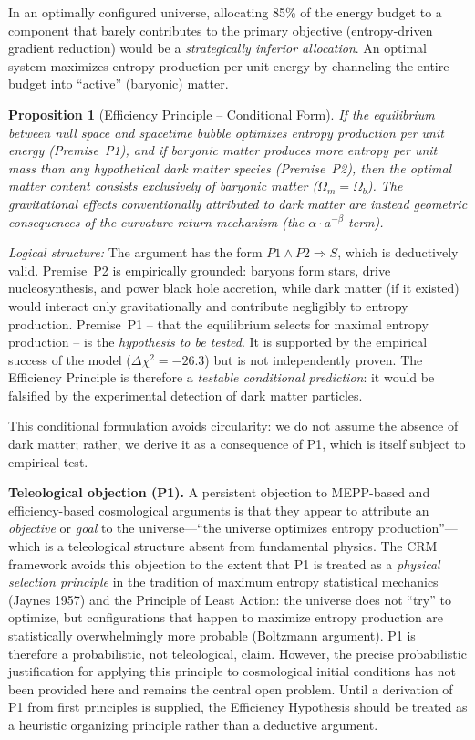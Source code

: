 \documentclass[aps,prd,twocolumn,superscriptaddress,nofootinbib,floatfix]{revtex4-2}
\newtheorem{proposition}{Proposition}
\begin{document}
In an optimally configured universe, allocating 85\% of the energy budget to a component that barely contributes to the primary objective (entropy-driven gradient reduction) would be a \textit{strategically inferior allocation}. An optimal system maximizes entropy production per unit energy by channeling the entire budget into ``active'' (baryonic) matter.

\begin{proposition}[Efficiency Principle -- Conditional Form]
\textit{If} the equilibrium between null space and spacetime bubble optimizes entropy production per unit energy (Premise~P1), and \textit{if} baryonic matter produces more entropy per unit mass than any hypothetical dark matter species (Premise~P2), \textit{then} the optimal matter content consists exclusively of baryonic matter ($\Omega_m = \Omega_b$). The gravitational effects conventionally attributed to dark matter are instead geometric consequences of the curvature return mechanism (the $\alpha \cdot a^{-\beta}$ term).
\end{proposition}

\textit{Logical structure:} The argument has the form $P1 \wedge P2 \Rightarrow S$, which is deductively valid. Premise~P2 is empirically grounded: baryons form stars, drive nucleosynthesis, and power black hole accretion, while dark matter (if it existed) would interact only gravitationally and contribute negligibly to entropy production. Premise~P1 -- that the equilibrium selects for maximal entropy production -- is the \textit{hypothesis to be tested}. It is supported by the empirical success of the model ($\Delta\chi^2 = -26.3$) but is not independently proven. The Efficiency Principle is therefore a \textit{testable conditional prediction}: it would be falsified by the experimental detection of dark matter particles.

This conditional formulation avoids circularity: we do not assume the absence of dark matter; rather, we derive it as a consequence of P1, which is itself subject to empirical test.

\textbf{Teleological objection (P1).} A persistent objection to MEPP-based and efficiency-based cosmological arguments is that they appear to attribute an \textit{objective} or \textit{goal} to the universe---``the universe optimizes entropy production''---which is a teleological structure absent from fundamental physics. The CRM framework avoids this objection to the extent that P1 is treated as a \textit{physical selection principle} in the tradition of maximum entropy statistical mechanics (Jaynes 1957) and the Principle of Least Action: the universe does not ``try'' to optimize, but configurations that happen to maximize entropy production are statistically overwhelmingly more probable (Boltzmann argument). P1 is therefore a probabilistic, not teleological, claim. However, the precise probabilistic justification for applying this principle to cosmological initial conditions has not been provided here and remains the central open problem. Until a derivation of P1 from first principles is supplied, the Efficiency Hypothesis should be treated as a heuristic organizing principle rather than a deductive argument.
\end{document}
